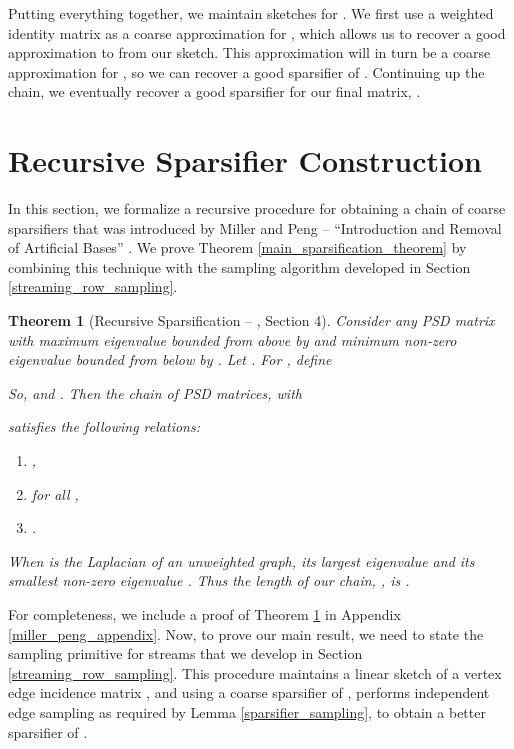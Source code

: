 \documentclass[11pt]{article}
\newtheorem{theorem}{Theorem}
\begin{document}
Putting everything together, we maintain  sketches for . We first use a weighted identity matrix as a coarse approximation for , which allows us to recover a good approximation to  from our sketch. This approximation will in turn be a coarse approximation for , so we can recover a good sparsifier of . Continuing up the chain, we eventually recover a good sparsifier for our final matrix, . 











\section{Recursive Sparsifier Construction}\label{recursive_algorithm}
In this section, we formalize a recursive procedure for obtaining a chain of coarse sparsifiers that was introduced by Miller and Peng  -- ``Introduction and Removal of Artificial Bases'' \cite{pengV1}. We prove Theorem \ref{main_sparsification_theorem} by combining this technique with the sampling algorithm developed in Section \ref{streaming_row_sampling}.



\begin{theorem}[Recursive Sparsification -- \cite{pengV1}, Section 4]
\label{miller_peng_chain}
Consider any PSD matrix  with maximum eigenvalue bounded from above by  and minimum non-zero eigenvalue bounded from below by . Let .  For , define

So,  and . Then the chain of PSD matrices,  with

satisfies the following relations:
\begin{enumerate}
  \item ,
  \item  for all ,
  \item .
\end{enumerate}
When  is the Laplacian of an unweighted graph, its largest eigenvalue  and its smallest non-zero eigenvalue . Thus the length of our chain, , is .
\end{theorem}

For completeness, we include a proof of Theorem \ref{miller_peng_chain} in Appendix \ref{miller_peng_appendix}.  Now, to prove our main result, we need to state the sampling primitive for streams that we develop in Section \ref{streaming_row_sampling}. This procedure maintains a linear sketch of a vertex edge incidence matrix , and using a coarse sparsifier of , performs independent edge sampling as required by Lemma \ref{sparsifier_sampling}, to obtain a better sparsifier of .
\end{document}
